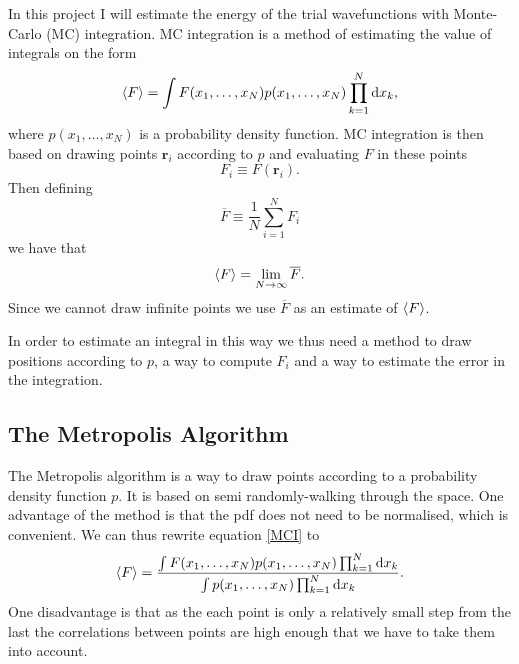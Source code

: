 \documentclass[a4paper,English,10pt]{article}
\newcommand{\bb}[1]{\boldsymbol{#1}}
\newcommand{\dd}{\mathrm{d}}
\newcommand{\rar}{\rightarrow}
\newcommand{\be}{\begin{equation}}
\newcommand{\ee}{\end{equation}}
\newcommand{\f}{\frac}
\renewcommand{\bar}{\overline}
\renewcommand{\braket}{\Braket}
\begin{document}
In this project I will estimate the energy of the trial wavefunctions with Monte-Carlo (MC) integration.
MC integration is a method of estimating the value of integrals on the form
\be
\braket{F} = \int F(x_1,\ldots,x_N)p(x_1,\ldots,x_N)\prod_{k=1}^N\dd x_k, \label{MCI}
\ee
where \(p(x_1,\ldots,x_N)\) is a probability density function.
MC integration is then based on drawing points $\bb{r}_i$ according to $p$ and evaluating $F$ in these points
\be
F_i \equiv F(\bb{r}_i).
\ee
Then defining
\be
\bar{F} \equiv \f{1}{N}\sum_{i=1}^N F_i
\ee
we have that
\be
\braket{F} = \lim_{N\rar\infty}\bar{F}.
\ee
Since we cannot draw infinite points we use $\bar{F}$ as an estimate of $\braket{F}$.

In order to estimate an integral in this way we thus need a method to draw positions according to $p$,
a way to compute $F_i$ and a way to estimate the error in the integration.





\subsection{The Metropolis Algorithm}

The Metropolis algorithm is a way to draw points according to a probability density function $p$. It is based on semi randomly-walking through
the space. One advantage of the method is that the pdf does not need to be normalised, which is convenient.
We can thus rewrite equation \ref{MCI} to
\be
\braket{F} = \f{\int F(x_1,\ldots,x_N)p(x_1,\ldots,x_N)\prod_{k=1}^N\dd x_k}{\int p(x_1,\ldots,x_N)\prod_{k=1}^N\dd x_k}. \label{exp}
\ee
One disadvantage is that
as the each point is only a relatively small step from the last the correlations between points are high enough that we have to take them into account.
\end{document}
